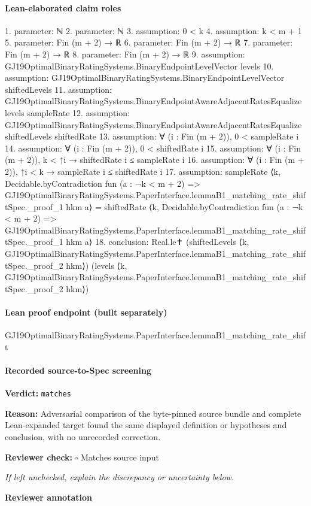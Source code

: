 \documentclass[10pt]{article}
\newcommand{\reviewerbox}{%
  \par\noindent\fbox{\parbox{0.96\linewidth}{\rule{0pt}{0.38in}}}\par
}
\newcommand{\reviewmatch}[1]{%
  \par\noindent\textbf{Reviewer check:} $\square$\; #1\par
  \noindent\emph{If left unchecked, explain the discrepancy or uncertainty below.}\par
}
\begin{document}
\paragraph{Lean-elaborated claim roles}\begin{ReviewVerbatim}
1. parameter: ℕ
2. parameter: ℕ
3. assumption: 0 < k
4. assumption: k < m + 1
5. parameter: Fin (m + 2) → ℝ
6. parameter: Fin (m + 2) → ℝ
7. parameter: Fin (m + 2) → ℝ
8. parameter: Fin (m + 2) → ℝ
9. assumption: GJ19OptimalBinaryRatingSystems.BinaryEndpointLevelVector levels
10. assumption: GJ19OptimalBinaryRatingSystems.BinaryEndpointLevelVector shiftedLevels
11. assumption: GJ19OptimalBinaryRatingSystems.BinaryEndpointAwareAdjacentRatesEqualize levels sampleRate
12. assumption: GJ19OptimalBinaryRatingSystems.BinaryEndpointAwareAdjacentRatesEqualize shiftedLevels shiftedRate
13. assumption: ∀ (i : Fin (m + 2)), 0 < sampleRate i
14. assumption: ∀ (i : Fin (m + 2)), 0 < shiftedRate i
15. assumption: ∀ (i : Fin (m + 2)), k < ↑i → shiftedRate i ≤ sampleRate i
16. assumption: ∀ (i : Fin (m + 2)), ↑i < k → sampleRate i ≤ shiftedRate i
17. assumption: sampleRate
    ⟨k,
      Decidable.byContradiction fun (a : ¬k < m + 2) =>
        GJ19OptimalBinaryRatingSystems.PaperInterface.lemmaB1_matching_rate_shiftSpec._proof_1 hkm a⟩ =
  shiftedRate
    ⟨k,
      Decidable.byContradiction fun (a : ¬k < m + 2) =>
        GJ19OptimalBinaryRatingSystems.PaperInterface.lemmaB1_matching_rate_shiftSpec._proof_1 hkm a⟩
18. conclusion: Real.le✝ (shiftedLevels ⟨k, GJ19OptimalBinaryRatingSystems.PaperInterface.lemmaB1_matching_rate_shiftSpec._proof_2 hkm⟩)
  (levels ⟨k, GJ19OptimalBinaryRatingSystems.PaperInterface.lemmaB1_matching_rate_shiftSpec._proof_2 hkm⟩)
\end{ReviewVerbatim}

\paragraph{Lean proof endpoint (built separately)}\begin{ReviewVerbatim}
GJ19OptimalBinaryRatingSystems.PaperInterface.lemmaB1_matching_rate_shift
\end{ReviewVerbatim}

\paragraph{Recorded source-to-Spec screening}
\textbf{Verdict:} \texttt{matches}
\\
{\raggedright
\textbf{Reason:} Adversarial comparison of the byte-\allowbreak{}pinned source bundle and complete Lean-\allowbreak{}expanded target found the same displayed definition or hypotheses and conclusion, with no unrecorded correction.\allowbreak{}
\par}
\reviewmatch{Matches source input}
\noindent\textbf{Reviewer annotation}\par
\reviewerbox
\clearpage
\hypertarget{source-claim-5249ffde05e3b08f}{}
\end{document}
